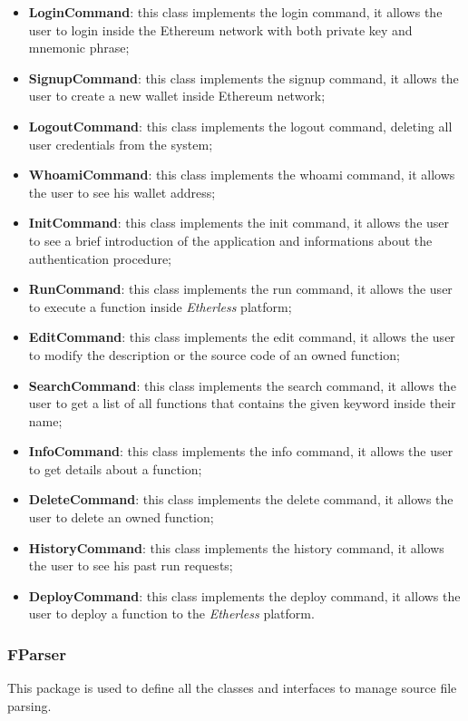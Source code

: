 			\begin{itemize}
				\item \textbf{LoginCommand}: this class implements the login command, it allows the user to login inside the Ethereum network with both private key and mnemonic phrase; 
				\item \textbf{SignupCommand}: this class implements the signup command, it allows the user to create a new wallet inside Ethereum network; 
				\item \textbf{LogoutCommand}: this class implements the logout command, deleting all user credentials from the system;  
				\item \textbf{WhoamiCommand}: this class implements the whoami command, it allows the user to see his wallet address; 
				\item \textbf{InitCommand}: this class implements the init command, it allows the user to see a brief introduction of the application and informations about the authentication procedure; 
				\item \textbf{RunCommand}: this class implements the run command, it allows the user to execute a function inside \textit{Etherless} platform; 
				\item \textbf{EditCommand}: this class implements the edit command, it allows the user to modify the description or the source code of an owned function; 
				\item \textbf{SearchCommand}: this class implements the search command, it allows the user to get a list of all functions that contains the given keyword inside their name; 
				\item \textbf{InfoCommand}: this class implements the info command, it allows the user to get details about a function; 
				\item \textbf{DeleteCommand}: this class implements the delete command, it allows the user to delete an owned function; 
				\item \textbf{HistoryCommand}: this class implements the history command, it allows the user to see his past run requests;
				\item \textbf{DeployCommand}: this class implements the deploy command, it allows the user to deploy a function to the \textit{Etherless} platform.
			\end{itemize}
		
		\subsubsection{FParser}
 		This package is used to define all the classes and interfaces to manage source file parsing.
		
